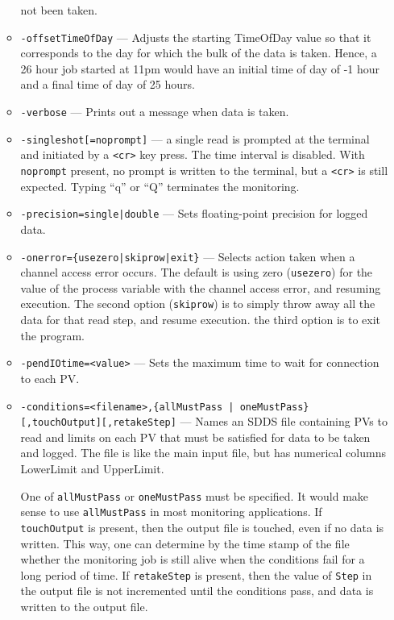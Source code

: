 \begin{itemize}
\begin{itemize}
                not been taken.
        \item {\tt -offsetTimeOfDay} --- Adjusts the starting TimeOfDay value so that it corresponds to the
                day for which the bulk of the data is taken.  Hence, a 26 hour job started at 11pm would have an
                initial time of day of -1 hour and a final time of day of 25 hours.
        \item {\tt -verbose} --- Prints out a message when data is taken.
        \item {\verb+-singleshot[=noprompt]+} --- a single read is prompted at the terminal
                and initiated by a \verb+<cr>+ key press. The time interval is disabled.
                With \verb+noprompt+ present, no prompt is written to the terminal, but a \verb+<cr>+
                is still expected. Typing ``q'' or ``Q'' terminates the monitoring.
        \item {\tt -precision={single|double}} --- Sets floating-point precision for logged data.
        \item {\tt -onerror=\{usezero|skiprow|exit\}} --- Selects action taken when a channel access error occurs.
                The default is using zero ({\tt usezero}) for the value of the process variable 
                with the channel access error, and resuming execution. The second option ({\tt skiprow}) is to
                simply throw away all the data for that read step, and resume execution.
                the third option is to exit the program.
        \item {\tt -pendIOtime=<value>} --- Sets the maximum time to wait for connection to each PV.
        \item {\verb+-conditions=<filename>,{allMustPass | oneMustPass}[,touchOutput][,retakeStep]+} --- 
                   Names an SDDS file containing PVs to read and limits on each PV that must
                   be satisfied for data to be taken and logged.  The file is like the main
                   input file, but has numerical columns LowerLimit and UpperLimit.

                One of \verb+allMustPass+ or \verb+oneMustPass+ must be specified. It would make sense
                to use \verb+allMustPass+ in most monitoring applications.
                If \verb+touchOutput+ is present, then the output file is touched, even if no data
                is written. This way, one can determine by the time stamp of the file
                whether the monitoring job is still alive
                when the conditions fail for a long period of time. If \verb+retakeStep+ is
                present, then the value of \verb+Step+ in the output file is not
                incremented until the conditions pass, and data is written to the output file.
    \end{itemize}


\end{itemize}
